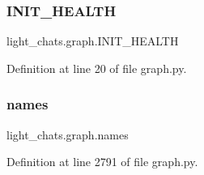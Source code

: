 \subsubsection{\texorpdfstring{I\+N\+I\+T\+\_\+\+H\+E\+A\+L\+TH}{INIT\_HEALTH}}
{\footnotesize\ttfamily light\+\_\+chats.\+graph.\+I\+N\+I\+T\+\_\+\+H\+E\+A\+L\+TH}



Definition at line 20 of file graph.\+py.

\mbox{\label{namespacelight__chats_1_1graph_ae2687376900f156c248dd3f8b8ee8b13}} 
\subsubsection{\texorpdfstring{names}{names}}
{\footnotesize\ttfamily light\+\_\+chats.\+graph.\+names}



Definition at line 2791 of file graph.\+py.


